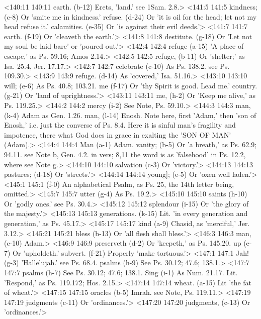 <140:11 140:11  earth. (b-12)  Erets, 'land.' see 1Sam. 2.8.>
<141:5 141:5  kindness; (c-8)  Or 'smite me in kindness.'
  refuse. (d-24)  Or 'it is oil for the head; let not my head refuse it.'
  calamities. (e-35)  Or 'is against their evil deeds.'>
<141:7 141:7  earth. (f-19)  Or 'cleaveth the earth.'>
<141:8 141:8  destitute. (g-18)  Or 'Let not my soul be laid bare' or 'poured out.'>
<142:4 142:4  refuge (a-15)  'A place of escape,' as Ps. 59.16; Amos 2.14.>
<142:5 142:5  refuge, (b-11)  Or 'shelter;' as Isa. 25.4, Jer. 17.17.>
<142:7 142:7  celebrate (c-10)  As Ps. 138.2. see Ps. 109.30.>
<143:9 143:9  refuge. (d-14)  As 'covered,' Isa. 51.16.>
<143:10 143:10  will; (e-6)  As Ps. 40.8; 103.21.
  me (f-17)  Or 'thy Spirit is good. Lead me.'
  country. (g-21)  Or 'land of uprightness.'>
<143:11 143:11  me, (h-2)  Or 'Keep me alive,' as Ps. 119.25.>
<144:2 144:2  mercy (i-2)  See Note, Ps. 59.10.>
<144:3 144:3  man, (k-4)  Adam as Gen. 1.26.
  man, (l-14)  Enosh. Note here, first 'Adam,' then 'son of Enosh,'  i.e. just the converse of Ps. 8.4. Here it is sinful man's  fragility and impotence, there what God does in grace in  exalting the 'SON OF MAN' (Adam).>
<144:4 144:4  Man (a-1)  Adam.
  vanity; (b-5)  Or 'a breath,' as Ps. 62.9; 94.11. see Note b, Gen. 4.2. in  vers; 8,11 the word is as 'falsehood' in Ps. 12.2, where see  Note g.>
<144:10 144:10  salvation (c-3)  Or 'victory.'>
<144:13 144:13  pastures; (d-18)  Or 'streets.'>
<144:14 144:14  young]; (e-5)  Or 'oxen well laden.'>
<145:1 145:1   (f-0)  An alphabetical Psalm, as Ps. 25, the 14th letter being,  omitted.>
<145:7 145:7  utter (g-4)  As Ps. 19.2.>
<145:10 145:10  saints (h-10)  Or 'godly ones.' see Ps. 30.4.>
<145:12 145:12  splendour (i-15)  Or 'the glory of the majesty.'>
<145:13 145:13  generations. (k-15)  Lit. 'in every generation and generation,' as Ps. 45.17.>
<145:17 145:17  kind (a-9)  Chasid, as 'merciful,' Jer. 3.12.>
<145:21 145:21  bless (b-13)  Or 'all flesh shall bless.'>
<146:3 146:3  man, (c-10)  Adam.>
<146:9 146:9  preserveth (d-2)  Or 'keepeth,' as Ps. 145.20.
  up (e-7)  Or 'upholdeth.'
  subvert. (f-21)  Properly 'make tortuous.'>
<147:1 147:1  Jah! (g-3)  'Hallelujah.' see Ps. 68.4.
  psalms (h-9)  See Ps. 30.12; 47.6; 138.1.>
<147:7 147:7  psalms (h-7)  See Ps. 30.12; 47.6; 138.1.
  Sing (i-1)  As Num. 21.17. Lit. 'Respond,' as Ps. 119.172; Hos. 2.15.>
<147:14 147:14  wheat. (a-15)  Lit 'the fat of wheat.'>
<147:15 147:15  oracles (b-5)  Imrah. see Note, Ps. 119.11.>
<147:19 147:19  judgments (c-11) Or 'ordinances.'>
<147:20 147:20  judgments, (c-13)  Or 'ordinances.'>
